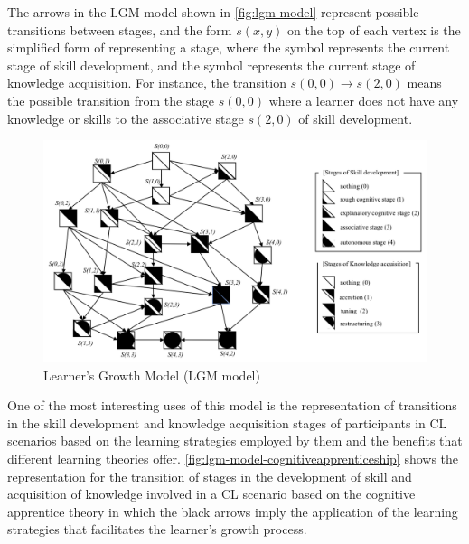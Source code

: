 The arrows in the LGM model shown in \autoref{fig:lgm-model} represent possible transitions between stages, and the form $s(x,y)$ on the top of each vertex is the simplified form of representing a stage, where the symbol  represents the current stage of skill development, and the symbol  represents the current stage of knowledge acquisition. For instance, the transition $s(0,0) \to s(2,0)$ means the possible transition from the stage $s(0,0)$ where a learner does not have any knowledge or skills to the associative stage $s(2,0)$ of skill development.

 \begin{figure}[htb]
 \caption{Learner’s Growth Model (LGM model)}
 \label{fig:lgm-model}
 \centering
 \includegraphics[width=1\textwidth]{images/chap-model-gmif/lgm-model.png}
\end{figure}

One of the most interesting uses of this model is the representation of transitions in the skill development and knowledge acquisition stages of participants in CL scenarios based on the learning strategies employed by them and the benefits that different learning theories offer. \autoref{fig:lgm-model-cognitiveapprenticeship} shows the representation for the transition of stages in the development of skill and acquisition of knowledge involved in a CL scenario based on the cognitive apprentice theory in which the black arrows imply the application of the learning strategies that facilitates the learner’s growth process.


